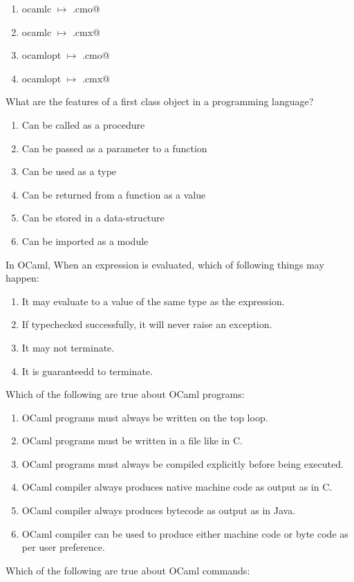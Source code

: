 \documentclass[addpoints,11pt]{exam}
\begin{document}
\begin{questions}
\begin{enumerate}
\item ocamlc $\mapsto$ \lstinline@program.cmo@
\item ocamlc $\mapsto$ \lstinline@program.cmx@
\item ocamlopt $\mapsto$ \lstinline@program.cmo@
\item ocamlopt $\mapsto$ \lstinline@program.cmx@
\end{enumerate}\question What are the features of a first class object in a programming language?
\begin{enumerate}
\item Can be called as a procedure
\item Can be passed as a parameter to a function
\item Can be used as a type
\item Can be returned from a function as a value
\item Can be stored in a data-structure
\item Can be imported as a module
\end{enumerate}\question In OCaml, When an expression is evaluated, which of following things may happen:
\begin{enumerate}
\item It may evaluate to a value of the same type as the expression.
\item If typechecked successfully, it will never raise an exception.
\item It may not terminate.
\item It is guaranteedd to terminate.
\end{enumerate}
\question Which of the following are true about OCaml programs:
\begin{enumerate}
\item OCaml programs must always be written on the top loop.
\item OCaml programs must be written in a file like in C.
\item OCaml programs must always be compiled explicitly before being executed.
\item OCaml compiler always produces native machine code as output as in C.
\item OCaml compiler always produces bytecode as output as in Java.
\item OCaml compiler can be used to produce either machine code or byte code as per user preference.
\end{enumerate}\question Which of the following are true about OCaml commands:
\begin{enumerate}

\end{enumerate}
\end{questions}
\end{document}
